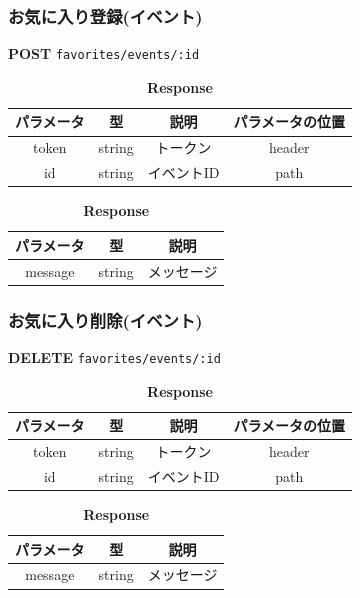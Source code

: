 \subsubsection*{お気に入り登録(イベント)}
\textbf{POST} \texttt{favorites/events/:id}
\begin{table}[H]
  \begin{minipage}
    {0.5\hsize}
    \centering
    \captionsetup{labelformat=empty,labelsep=none}
    \caption{\textbf{Request}}
    \small
    \begin{tabular}{|c|c|c|c|} \hline
      パラメータ & 型      & 説明     & パラメータの位置 \\ \hline \hline
      token & string & トークン   & header   \\ \hline
      id    & string & イベントID & path     \\ \hline
    \end{tabular}
  \end{minipage}
  \begin{minipage}
    {0.5\hsize}
    \centering
    \captionsetup{labelformat=empty,labelsep=none}
    \caption{\textbf{Response}}
    \begin{tabular}{|c|c|c|} \hline
      パラメータ   & 型      & 説明    \\ \hline \hline
      message & string & メッセージ \\ \hline
    \end{tabular}
  \end{minipage}
\end{table}

\subsubsection*{お気に入り削除(イベント)}
\textbf{DELETE} \texttt{favorites/events/:id}
\begin{table}[H]
  \begin{minipage}
    {0.5\hsize}
    \centering
    \captionsetup{labelformat=empty,labelsep=none}
    \caption{\textbf{Request}}
    \small
    \begin{tabular}{|c|c|c|c|} \hline
      パラメータ & 型      & 説明     & パラメータの位置 \\ \hline \hline
      token & string & トークン   & header   \\ \hline
      id    & string & イベントID & path     \\ \hline
    \end{tabular}
  \end{minipage}
  \begin{minipage}
    {0.5\hsize}
    \centering
    \captionsetup{labelformat=empty,labelsep=none}
    \caption{\textbf{Response}}
    \begin{tabular}{|c|c|c|} \hline
      パラメータ   & 型      & 説明    \\ \hline \hline
      message & string & メッセージ \\ \hline
    \end{tabular}
  \end{minipage}
\end{table}

